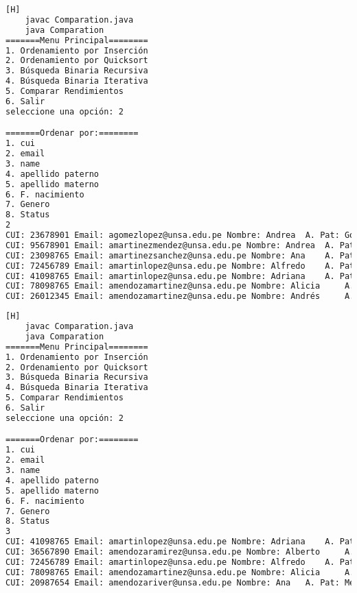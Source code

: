    	\begin{lstlisting}[language=bash,caption={Compilación y ejecución del código}][H]
    javac Comparation.java
    java Comparation
=======Menu Principal========
1. Ordenamiento por Inserción
2. Ordenamiento por Quicksort
3. Búsqueda Binaria Recursiva
4. Búsqueda Binaria Iterativa
5. Comparar Rendimientos
6. Salir
seleccione una opción: 2

=======Ordenar por:========
1. cui
2. email
3. name
4. apellido paterno
5. apellido materno
6. F. nacimiento
7. Genero
8. Status
2
CUI: 23678901 Email: agomezlopez@unsa.edu.pe Nombre: Andrea	 A. Pat: Gomez A. Mat: Lopez Fecha de Nacimiento: 1999-04-05 Genero: 0 Estado: 1
CUI: 95678901 Email: amartinezmendez@unsa.edu.pe Nombre: Andrea	 A. Pat: Martinez A. Mat: Mendez Fecha de Nacimiento: 1997-10-14 Genero: 0 Estado: 1
CUI: 23098765 Email: amartinezsanchez@unsa.edu.pe Nombre: Ana	 A. Pat: Martinez A. Mat: Sanchez Fecha de Nacimiento: 1996-12-13 Genero: 0 Estado: 1
CUI: 72456789 Email: amartinlopez@unsa.edu.pe Nombre: Alfredo	 A. Pat: Martin A. Mat: Lopez Fecha de Nacimiento: 1991-08-21 Genero: 0 Estado: 1
CUI: 41098765 Email: amartinlopez@unsa.edu.pe Nombre: Adriana	 A. Pat: Martin A. Mat: Lopez Fecha de Nacimiento: 1993-03-30 Genero: 0 Estado: 1
CUI: 78098765 Email: amendozamartinez@unsa.edu.pe Nombre: Alicia	 A. Pat: Mendoza A. Mat: Martinez Fecha de Nacimiento: 1991-08-07 Genero: 0 Estado: 1
CUI: 26012345 Email: amendozamartinez@unsa.edu.pe Nombre: Andrés	 A. Pat: Mendoza A. Mat: Martinez Fecha de Nacimiento: 1989-11-08 Genero: 1 Estado: 1

  \end{lstlisting}

   	\begin{lstlisting}[language=bash,caption={Compilación y ejecución del código}][H]
    javac Comparation.java
    java Comparation
=======Menu Principal========
1. Ordenamiento por Inserción
2. Ordenamiento por Quicksort
3. Búsqueda Binaria Recursiva
4. Búsqueda Binaria Iterativa
5. Comparar Rendimientos
6. Salir
seleccione una opción: 2

=======Ordenar por:========
1. cui
2. email
3. name
4. apellido paterno
5. apellido materno
6. F. nacimiento
7. Genero
8. Status
3
CUI: 41098765 Email: amartinlopez@unsa.edu.pe Nombre: Adriana	 A. Pat: Martin A. Mat: Lopez Fecha de Nacimiento: 1993-03-30 Genero: 0 Estado: 1
CUI: 36567890 Email: amendozaramirez@unsa.edu.pe Nombre: Alberto	 A. Pat: Mendoza A. Mat: Ramirez Fecha de Nacimiento: 1991-05-14 Genero: 0 Estado: 1
CUI: 72456789 Email: amartinlopez@unsa.edu.pe Nombre: Alfredo	 A. Pat: Martin A. Mat: Lopez Fecha de Nacimiento: 1991-08-21 Genero: 0 Estado: 1
CUI: 78098765 Email: amendozamartinez@unsa.edu.pe Nombre: Alicia	 A. Pat: Mendoza A. Mat: Martinez Fecha de Nacimiento: 1991-08-07 Genero: 0 Estado: 1
CUI: 20987654 Email: amendozariver@unsa.edu.pe Nombre: Ana	 A. Pat: Mendoza A. Mat: Rivera Fecha de Nacimiento: 1997-03-25 Genero: 0 Estado: 1

  \end{lstlisting}

